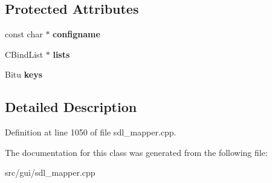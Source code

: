 \subsection*{Protected Attributes}
\begin{DoxyCompactItemize}
\item 
\hypertarget{classCKeyBindGroup_a7202ea1d9a5efdcda4f277d03e63ad63}{const char $\ast$ {\bfseries configname}}\label{classCKeyBindGroup_a7202ea1d9a5efdcda4f277d03e63ad63}

\item 
\hypertarget{classCKeyBindGroup_a915bc22f23540b1f8924adc831ba86ee}{C\-Bind\-List $\ast$ {\bfseries lists}}\label{classCKeyBindGroup_a915bc22f23540b1f8924adc831ba86ee}

\item 
\hypertarget{classCKeyBindGroup_a0d64ae014dfbdc463fea363dccd1bda6}{Bitu {\bfseries keys}}\label{classCKeyBindGroup_a0d64ae014dfbdc463fea363dccd1bda6}

\end{DoxyCompactItemize}


\subsection{Detailed Description}


Definition at line 1050 of file sdl\-\_\-mapper.\-cpp.



The documentation for this class was generated from the following file\-:\begin{DoxyCompactItemize}
\item 
src/gui/sdl\-\_\-mapper.\-cpp\end{DoxyCompactItemize}

